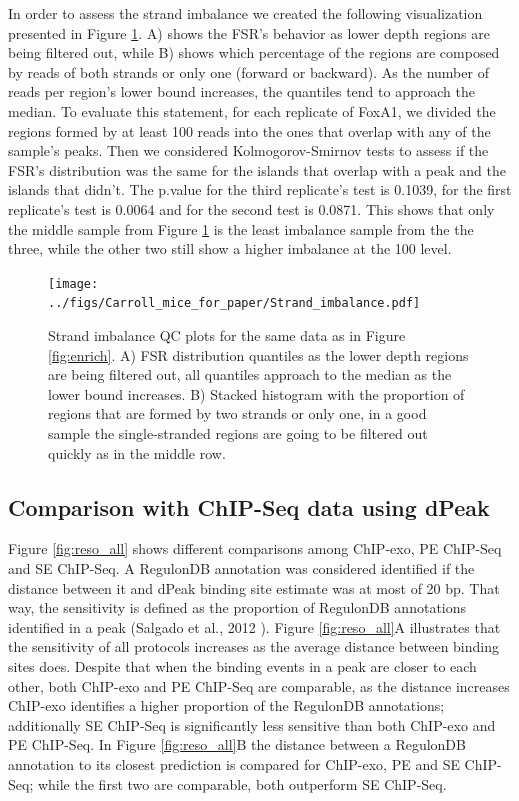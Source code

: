 \documentclass[11pt]{article}\usepackage[]{graphicx}\usepackage[]{color}
\begin{document}
In order to assess the strand imbalance we created the following
visualization presented in Figure \ref{fig:strand}. A) shows the FSR's
behavior as lower depth regions are being filtered out, while B) shows
which percentage of the regions are composed by reads of both strands
or only one (forward or backward). As the number of reads per region's
lower bound increases, the quantiles tend to approach the median. To
evaluate this statement, for each replicate of FoxA1, we divided the
regions formed by at least 100 reads into the ones that overlap
with any of the sample's peaks. Then we considered Kolmogorov-Smirnov
tests to assess if the FSR's distribution was the same for the islands
that overlap with a peak and the islands that didn't. The p.value for
the third replicate's test is 0.1039, for the first
replicate's test is 0.0064 and for the second test is
0.0871. This shows that only the middle sample from Figure
\ref{fig:strand} is the least imbalance sample from the the three,
while the other two still show a higher imbalance at the 100
level.

\begin{figure}[H]
  \centering  
  \texttt{[image: ../figs/Carroll\_mice\_for\_paper/Strand\_imbalance.pdf]} 
  \caption{Strand imbalance QC plots for the same data as in Figure
    \ref{fig:enrich}. A) FSR distribution quantiles as the lower depth
    regions are being filtered out, all quantiles approach to the
    median as the lower bound increases. B) Stacked histogram with the
    proportion of regions that are formed by two strands or only one,
    in a good sample the single-stranded regions are going to be
    filtered out quickly as in the middle row.}
  \label{fig:strand}
\end{figure}

\subsection{Comparison with ChIP-Seq data using dPeak}
\label{sec:dpeak_analysis}




Figure \ref{fig:reso_all} shows different comparisons among ChIP-exo,
PE ChIP-Seq and SE ChIP-Seq. A RegulonDB annotation was considered
identified if the distance between it and dPeak binding site estimate
was at most of 20 bp. That way, the sensitivity is defined as
the proportion of RegulonDB annotations identified in a peak (Salgado
et al., 2012 \cite{regulonDB}). Figure \ref{fig:reso_all}A illustrates
that the sensitivity of all protocols increases as the average
distance between binding sites does. Despite that when the binding
events in a peak are closer to each other, both ChIP-exo and PE
ChIP-Seq are comparable, as the distance increases ChIP-exo identifies
a higher proportion of the RegulonDB annotations; additionally SE
ChIP-Seq is significantly less sensitive than both ChIP-exo and PE
ChIP-Seq. In Figure \ref{fig:reso_all}B the distance between a
RegulonDB annotation to its closest prediction is compared for
ChIP-exo, PE and SE ChIP-Seq; while the first two are comparable,
both outperform SE ChIP-Seq.
\end{document}
